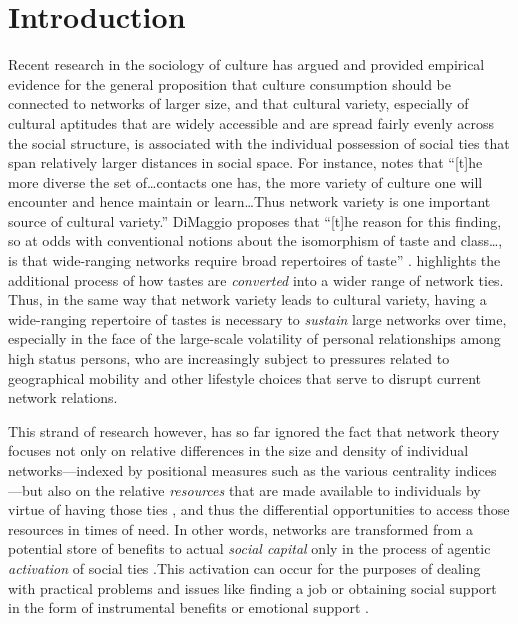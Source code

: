 \documentclass[12pt]{article}
\begin{document}
\section{Introduction}
Recent research in the sociology of culture has argued and provided empirical evidence for the general proposition that culture consumption should be connected to networks of larger size, and that cultural variety, especially of cultural aptitudes that are widely accessible and are spread fairly evenly across the social structure, is associated with the individual possession of social ties that span relatively larger distances in social space. For instance, \citet[247]{erickson96} notes that ``[t]he more diverse the set of{\ldots}contacts one has, the more variety of culture one will encounter and hence maintain or learn{\ldots}Thus network variety is one important source of cultural variety.'' DiMaggio proposes that ``[t]he reason for this finding, so at odds with conventional notions about the isomorphism of taste and class{\ldots}, is that wide-ranging networks require broad repertoires of taste'' \citeyearpar[444]{dimaggio87}. \citet{lizardo06a} highlights the additional process of how tastes are \emph{converted} into a wider range of network ties. Thus, in the same way that network variety leads to cultural variety, having a wide-ranging repertoire of tastes is necessary to \emph{sustain} large networks over time, especially in the face of the large-scale volatility of personal relationships among high status persons, who are increasingly subject to pressures related to geographical mobility and other lifestyle choices that serve to disrupt current network relations.

This strand of research however, has so far ignored the fact that network theory focuses not only on relative differences in the size and density of individual networks---indexed by positional measures such as the various centrality indices \citep{freeman77, borgatti05}---but also on the relative \emph{resources} that are made available to individuals by virtue of having those ties \citep{bourdieu86, coleman88, portes98, lin01b}, and thus the differential opportunities to access those resources in times of need. In other words, networks are transformed from a potential store of benefits to actual\emph{ social capital} only in the process of agentic \emph{activation} of social ties \citep{lin99, lin00, lin01a, lin01b,mouw03, yakubovich05, lin_etal81a, lin_etal81b, lin_dumin86}.This activation can occur for the purposes of dealing with practical problems and issues like finding a job \citep{granovetter73} or obtaining social support in the form of instrumental benefits or emotional support \citep{wellman_wortley90}. 
\end{document}
